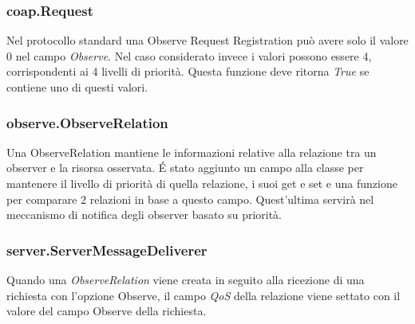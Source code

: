 			\subsubsection{coap.Request}
				Nel protocollo standard una Observe Request Registration può avere solo il valore 0 nel campo \textit{Observe}. Nel caso considerato invece i valori possono essere 4, corrispondenti ai 4 livelli di priorità. Questa funzione deve ritorna \textit{True} se 	contiene uno di questi valori. \newline
				

			\subsubsection{observe.ObserveRelation}
			Una ObserveRelation mantiene le informazioni relative alla relazione tra un observer e la risorsa osservata. \'E stato aggiunto un 	campo alla classe per mantenere il livello di priorità di quella relazione, i suoi get e set e una funzione per comparare 2 relazioni in base a questo campo. Quest'ultima servirà nel meccanismo di notifica degli observer basato su priorità. \newline
				
				

			\subsubsection{server.ServerMessageDeliverer}
				Quando una \textit{ObserveRelation} viene creata in seguito alla ricezione di una richiesta con l’opzione Observe, il campo \textit{QoS} della relazione viene settato con il valore del campo Observe della richiesta. \newline
				


